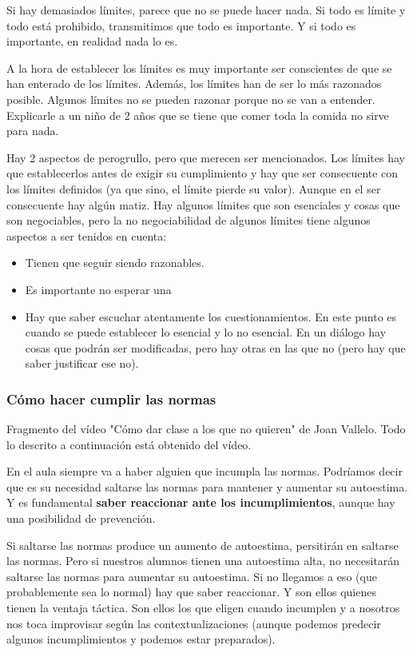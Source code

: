 \documentclass[palatino]{apuntesURJC}
\begin{document}
Si hay demasiados límites, parece que no se puede hacer nada. 
%
Si todo es límite y todo está prohibido, transmitimos que todo es importante.
%
Y si todo es importante, en realidad nada lo es.

A la hora de establecer los límites es muy importante ser conscientes de que se han enterado de los límites.
%
Además, los límites han de ser lo más razonados posible. 
%
Algunos límites no se pueden razonar porque no se van a entender.
%
Explicarle a un niño de 2 años que se tiene que comer toda la comida no sirve para nada.

Hay 2 aspectos de perogrullo, pero que merecen ser mencionados. 
%
Los límites hay que establecerlos antes de exigir su cumplimiento y hay que ser consecuente con los límites definidos (ya que sino, el límite pierde su valor).
%
Aunque en el ser consecuente hay algún matiz.
%
Hay algunos límites que son esenciales y cosas que son negociables, pero la no negociabilidad de algunos límites tiene algunos aspectos a ser tenidos en cuenta:

\begin{itemize}
	\item Tienen que seguir siendo razonables.
	\item Es importante no esperar una 
	\item Hay que saber escuchar atentamente los cuestionamientos. 
	En este punto es cuando se puede establecer lo esencial y lo no esencial.
	En un diálogo hay cosas que podrán ser modificadas, pero hay otras en las que no (pero hay que saber justificar ese no).
\end{itemize}


\subsubsection{Cómo hacer cumplir las normas}

Fragmento del vídeo "Cómo dar clase a los que no quieren" de Joan Vallelo.
%
Todo lo descrito a continuación está obtenido del vídeo.

En el aula siempre va a haber alguien que incumpla las normas.
%
Podríamos decir que es su necesidad saltarse las normas para mantener y aumentar su autoestima.
%
Y es fundamental \textbf{saber reaccionar ante los incumplimientos}, aunque hay una posibilidad de prevención.

Si saltarse las normas produce un aumento de autoestima, persitirán en saltarse las normas.
%
Pero si nuestros alumnos tienen una autoestima alta, no necesitarán saltarse las normas para aumentar su autoestima.
%
Si no llegamos a eso (que probablemente sea lo normal) hay que saber reaccionar.
%
Y son ellos quienes tienen la ventaja táctica. Son ellos los que eligen cuando incumplen y a nosotros nos toca improvisar según las contextualizaciones (aunque podemos predecir algunos incumplimientos y podemos estar preparados).
\end{document}
